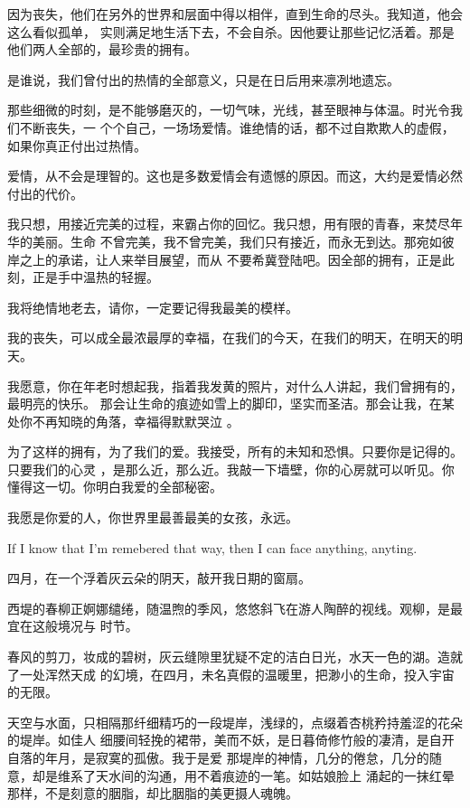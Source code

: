 \documentclass[12pt,a4paper]{article}
\begin{document}
		因为丧失，他们在另外的世界和层面中得以相伴，直到生命的尽头。我知道，他会这么看似孤单，
	实则满足地生活下去，不会自杀。因他要让那些记忆活着。那是他们两人全部的，最珍贵的拥有。

		是谁说，我们曾付出的热情的全部意义，只是在日后用来凛冽地遗忘。

		那些细微的时刻，是不能够磨灭的，一切气味，光线，甚至眼神与体温。时光令我们不断丧失，一
	个个自己，一场场爱情。谁绝情的话，都不过自欺欺人的虚假，如果你真正付出过热情。

		爱情，从不会是理智的。这也是多数爱情会有遗憾的原因。而这，大约是爱情必然付出的代价。

		我只想，用接近完美的过程，来霸占你的回忆。我只想，用有限的青春，来焚尽年华的美丽。生命
	不曾完美，我不曾完美，我们只有接近，而永无到达。那宛如彼岸之上的承诺，让人来举目展望，而从
	不要希冀登陆吧。因全部的拥有，正是此刻，正是手中温热的轻握。

		我将绝情地老去，请你，一定要记得我最美的模样。

		我的丧失，可以成全最浓最厚的幸福，在我们的今天，在我们的明天，在明天的明天。

		我愿意，你在年老时想起我，指着我发黄的照片，对什么人讲起，我们曾拥有的，最明亮的快乐。
	那会让生命的痕迹如雪上的脚印，坚实而圣洁。那会让我，在某处你不再知晓的角落，幸福得默默哭泣
	。

		为了这样的拥有，为了我们的爱。我接受，所有的未知和恐惧。只要你是记得的。只要我们的心灵
	，是那么近，那么近。我敲一下墙壁，你的心房就可以听见。你懂得这一切。你明白我爱的全部秘密。

		我愿是你爱的人，你世界里最善最美的女孩，永远。

		If I know that I'm remebered that way, then I can face anything, anyting.

	\endwriting



		四月，在一个浮着灰云朵的阴天，敲开我日期的窗扇。

		西堤的春柳正婀娜缱绻，随温煦的季风，悠悠斜飞在游人陶醉的视线。观柳，是最宜在这般境况与
	时节。

		春风的剪刀，妆成的碧树，灰云缝隙里犹疑不定的洁白日光，水天一色的湖。造就了一处浑然天成
	的幻境，在四月，未名真假的温暖里，把渺小的生命，投入宇宙的无限。

		天空与水面，只相隔那纤细精巧的一段堤岸，浅绿的，点缀着杏桃矜持羞涩的花朵的堤岸。如佳人
	细腰间轻挽的裙带，美而不妖，是日暮倚修竹般的凄清，是自开自落的年月，是寂寞的孤傲。我于是爱
	那堤岸的神情，几分的倦怠，几分的随意，却是维系了天水间的沟通，用不着痕迹的一笔。如姑娘脸上
	涌起的一抹红晕那样，不是刻意的胭脂，却比胭脂的美更摄人魂魄。
\end{document}
